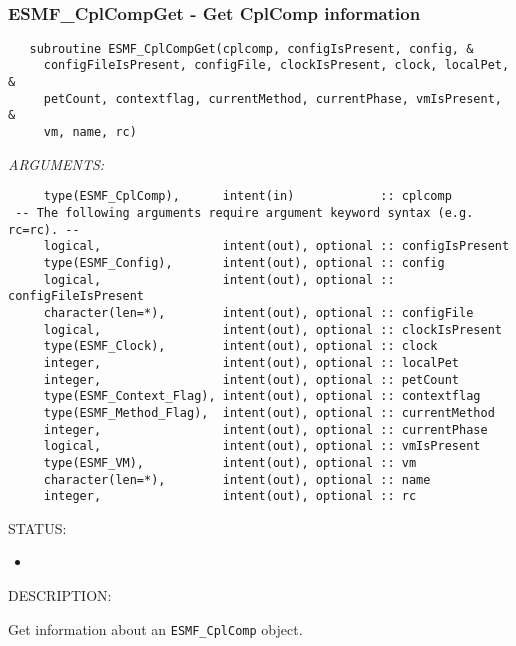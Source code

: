  
\mbox{}\hrulefill\ 
 
\subsubsection [ESMF\_CplCompGet] {ESMF\_CplCompGet - Get CplComp information}


  
\begin{verbatim}   subroutine ESMF_CplCompGet(cplcomp, configIsPresent, config, &
     configFileIsPresent, configFile, clockIsPresent, clock, localPet, &
     petCount, contextflag, currentMethod, currentPhase, vmIsPresent, &
     vm, name, rc)\end{verbatim}{\em ARGUMENTS:}
\begin{verbatim}     type(ESMF_CplComp),      intent(in)            :: cplcomp
 -- The following arguments require argument keyword syntax (e.g. rc=rc). --
     logical,                 intent(out), optional :: configIsPresent
     type(ESMF_Config),       intent(out), optional :: config
     logical,                 intent(out), optional :: configFileIsPresent
     character(len=*),        intent(out), optional :: configFile
     logical,                 intent(out), optional :: clockIsPresent
     type(ESMF_Clock),        intent(out), optional :: clock
     integer,                 intent(out), optional :: localPet
     integer,                 intent(out), optional :: petCount
     type(ESMF_Context_Flag), intent(out), optional :: contextflag
     type(ESMF_Method_Flag),  intent(out), optional :: currentMethod
     integer,                 intent(out), optional :: currentPhase
     logical,                 intent(out), optional :: vmIsPresent
     type(ESMF_VM),           intent(out), optional :: vm
     character(len=*),        intent(out), optional :: name
     integer,                 intent(out), optional :: rc\end{verbatim}
{\sf STATUS:}
   \begin{itemize}
   \item{}
   \end{itemize}
  
{\sf DESCRIPTION:\\ }


   Get information about an {\tt ESMF\_CplComp} object.
  
